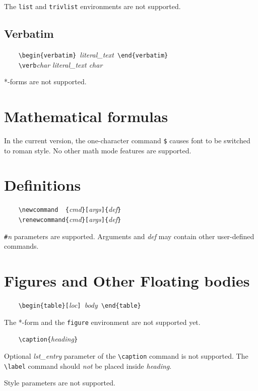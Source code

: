 The \verb'list' and \verb'trivlist' environments are not supported.

\subsection{Verbatim}

\verb'    \begin{verbatim} '{\it literal\_text}\verb' \end{verbatim}'  \\
\verb'    \verb'{\it char literal\_text char}

*-forms are not supported.

\section{Mathematical formulas}

In the current version, the one-character command \verb'$' causes font
to be switched to roman style. No other math mode features are supported.

\section{Definitions}

\verb'    \newcommand  {'{\it cmd}\verb'}['{\it args}\verb']{'{\it def}\verb'}' \\
\verb'    \renewcommand{'{\it cmd}\verb'}['{\it args}\verb']{'{\it def}\verb'}'

\verb'#'{\it n} parameters are supported. Arguments and {\it def} may contain
other user-defined commands.

\section{Figures and Other Floating bodies}

\verb'    \begin{table}['{\it loc}\verb'] '{\it body}\verb' \end{table}'

The *-form and the \verb'figure' environment are not supported yet.

\verb'    \caption{'{\it heading}\verb'}'

Optional {\it lst\_entry} parameter of the \verb'\caption' command is not
supported. The \verb'\label' command should {\em not} be placed inside
{\it heading}.

Style parameters are not supported.

